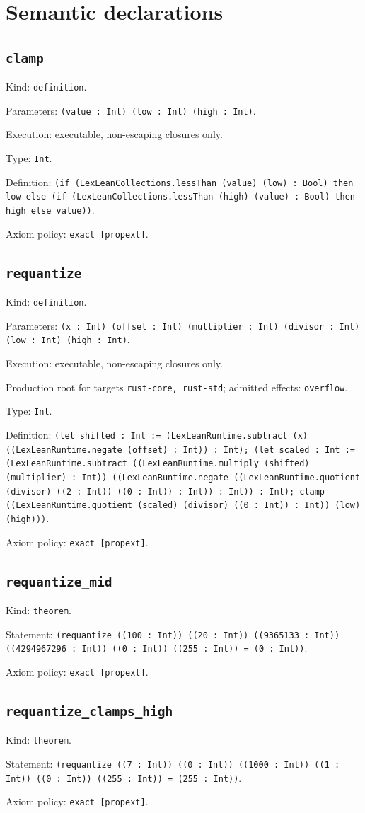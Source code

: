 \documentclass[11pt]{article}
\begin{document}
\section*{Semantic declarations}
\subsection*{\texttt{clamp}}
\noindent Kind: \texttt{definition}.\par
\noindent Parameters: \texttt{(value : Int) (low : Int) (high : Int)}.\par
\noindent Execution: executable, non-escaping closures only.\par
\noindent Type: \texttt{Int}.\par
\noindent Definition: \texttt{(if (LexLeanCollections.lessThan (value) (low) : Bool) then low else (if (LexLeanCollections.lessThan (high) (value) : Bool) then high else value))}.\par
\noindent Axiom policy: \texttt{exact [propext]}.\par
\subsection*{\texttt{requantize}}
\noindent Kind: \texttt{definition}.\par
\noindent Parameters: \texttt{(x : Int) (offset : Int) (multiplier : Int) (divisor : Int) (low : Int) (high : Int)}.\par
\noindent Execution: executable, non-escaping closures only.\par
\noindent Production root for targets \texttt{rust-core, rust-std}; admitted effects: \texttt{overflow}.\par
\noindent Type: \texttt{Int}.\par
\noindent Definition: \texttt{(let shifted : Int := (LexLeanRuntime.subtract (x) ((LexLeanRuntime.negate (offset) : Int)) : Int); (let scaled : Int := (LexLeanRuntime.subtract ((LexLeanRuntime.multiply (shifted) (multiplier) : Int)) ((LexLeanRuntime.negate ((LexLeanRuntime.quotient (divisor) ((2 : Int)) ((0 : Int)) : Int)) : Int)) : Int); clamp ((LexLeanRuntime.quotient (scaled) (divisor) ((0 : Int)) : Int)) (low) (high)))}.\par
\noindent Axiom policy: \texttt{exact [propext]}.\par
\subsection*{\texttt{requantize\_mid}}
\noindent Kind: \texttt{theorem}.\par
\noindent Statement: \texttt{(requantize ((100 : Int)) ((20 : Int)) ((9365133 : Int)) ((4294967296 : Int)) ((0 : Int)) ((255 : Int)) = (0 : Int))}.\par
\noindent Axiom policy: \texttt{exact [propext]}.\par
\subsection*{\texttt{requantize\_clamps\_high}}
\noindent Kind: \texttt{theorem}.\par
\noindent Statement: \texttt{(requantize ((7 : Int)) ((0 : Int)) ((1000 : Int)) ((1 : Int)) ((0 : Int)) ((255 : Int)) = (255 : Int))}.\par
\noindent Axiom policy: \texttt{exact [propext]}.\par
\end{document}
